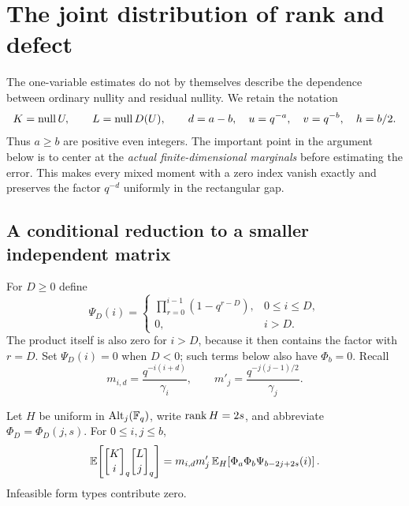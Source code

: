 \section{The joint distribution of rank and defect}\label{sec:joint-proof}

The one-variable estimates do not by themselves describe the dependence between
ordinary nullity and residual nullity. We retain the notation
\[
 K=\operatorname{null} U,\qquad L=\operatorname{null} D(U),\qquad
 d=a-b,\quad u=q^{-a},\quad v=q^{-b},\quad h=b/2.
\]
Thus $a\ge b$ are positive even integers. The important point in the argument
below is to center at the \emph{actual finite-dimensional marginals} before
estimating the error. This makes every mixed moment with a zero index vanish
exactly and preserves the factor $q^{-d}$ uniformly in the rectangular gap.

\subsection{A conditional reduction to a smaller independent matrix}

For $D\ge0$ define
\[
 \Psi_D(i)=
 \begin{cases}
 \displaystyle\prod_{r=0}^{i-1}(1-q^{r-D}),&0\le i\le D,\\[3pt]
 0,&i>D.
 \end{cases}
\]
The product itself is also zero for $i>D$, because it then contains the
factor with $r=D$. Set $\Psi_D(i)=0$ when $D<0$; such terms below also have
$\Phi_b=0$. Recall
\[
 m_{i,d}=\frac{q^{-i(i+d)}}{\gamma_i},\qquad
 m'_j=\frac{q^{-j(j-1)/2}}{\gamma_j}.
\]

\begin{lemma}\label{lem:mixed-moments}
Let $H$ be uniform in $\operatorname{Alt}_j(\mathbb F_q)$, write $\operatorname{rank} H=2s$, and abbreviate
$\Phi_D=\Phi_D(j,s)$. For $0\le i,j\le b$,
\begin{equation}\label{eq:mixed-moments}
 \E\!\left[\qbin{K}{i}\qbin{L}{j}\right]
 =m_{i,d}m'_j\,
   \E_H\!\left[\Phi_a\Phi_b\Psi_{b-2j+2s}(i)\right].
\end{equation}
Infeasible form types contribute zero.
\end{lemma}

